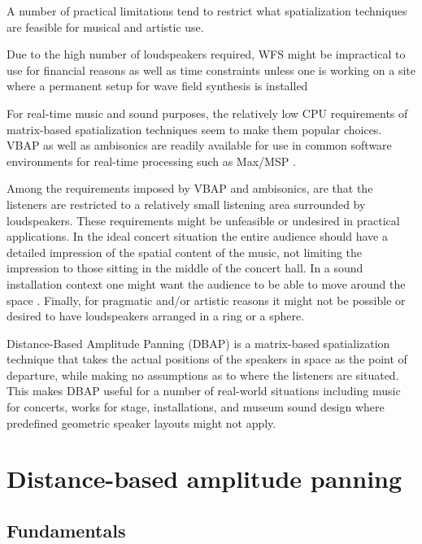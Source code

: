 \documentclass[twoside,10pt]{article}
\begin{document}
A number of practical limitations tend to restrict what spatialization techniques are feasible for musical and artistic use.

Due to the high number of loudspeakers required, WFS might be impractical to use for financial reasons as well as time constraints unless one is working on a site where a permanent setup for wave field synthesis is installed

For real-time music and sound purposes, the relatively low CPU requirements of matrix-based spatialization techniques seem to make them popular choices. VBAP as well as ambisonics are readily available for use in common software environments for real-time processing such as Max/MSP \cite{Pulkki:2000vbap_max, Schacher:2006ambi_max, Neukom:2008ambipan}.

Among the requirements imposed by VBAP and ambisonics, are that the listeners are restricted to a relatively small listening area surrounded by loudspeakers.  These requirements might be unfeasible or undesired in practical applications.  In the ideal concert situation the entire audience should have a detailed impression of the spatial content of the music, not limiting the impression to those sitting in the middle of the concert hall. In a sound installation context one might want the audience to be able to move around the space \cite{lossius:2008installations}.  Finally, for pragmatic and/or artistic reasons it might not be possible or desired to have loudspeakers arranged in a ring or a sphere.

Distance-Based Amplitude Panning (DBAP) is a matrix-based spatialization technique that takes the actual positions of the speakers in space as the point of departure, while making no assumptions as to where the listeners are situated. This makes DBAP useful for a number of real-world situations including music for concerts, works for stage, installations, and museum sound design where predefined geometric speaker layouts might not apply.


%
%

\section{Distance-based amplitude panning}

\subsection{Fundamentals}
\end{document}
